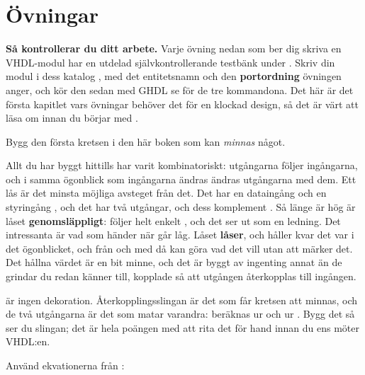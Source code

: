 
\section{Övningar}
\label{c3:sec:exercises}

\begin{aside}
\textbf{Så kontrollerar du ditt arbete.} Varje övning nedan som ber dig skriva en VHDL-modul har
en utdelad självkontrollerande testbänk under . Skriv din modul i
dess katalog , med det entitetsnamn och den \textbf{portordning}
övningen anger, och kör den sedan med GHDL \textemdash{} se  för de tre
kommandona. Det här är det första kapitlet vars övningar behöver det för en klockad design, så det
är värt att läsa om innan du börjar med .
\end{aside}


\label{c3:ex:latch}
Bygg den första kretsen i den här boken som kan \emph{minnas} något.

Allt du har byggt hittills har varit kombinatoriskt: utgångarna följer ingångarna, och i samma
ögonblick som ingångarna ändras ändras utgångarna med dem. Ett lås är det minsta möjliga avsteget
från det. Det har en dataingång  och en styringång , och det har två
utgångar,  och dess komplement . Så länge  är hög är låset
\textbf{genomsläppligt}:  följer helt enkelt , och det ser ut som en ledning. Det
intressanta är vad som händer när  går låg. Låset \textbf{låser}, och håller kvar det
 var i det ögonblicket, och från och med då kan  göra vad det vill utan att
 märker det. Det hållna värdet är en bit minne, och det är byggt av ingenting annat än de
grindar du redan känner till, kopplade så att utgången återkopplas till ingången.

 är ingen dekoration. Återkopplingsslingan är det som får kretsen att minnas, och de två
utgångarna är det som matar varandra:  beräknas ur  och  ur .
Bygg det så ser du slingan; det är hela poängen med att rita det för hand innan du ens möter
VHDL:en.

Använd ekvationerna från :

